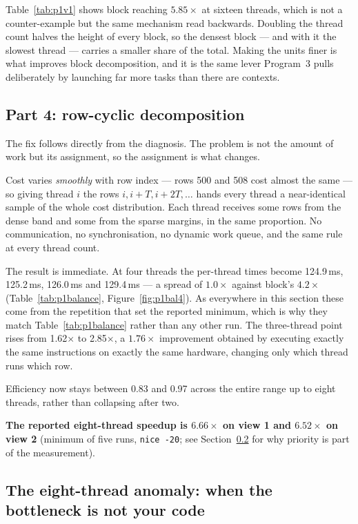 \documentclass[11pt,a4paper]{article}
\newcommand{\ms}[1]{#1\,ms}
\begin{document}
Table~\ref{tab:p1v1} shows block reaching $5.85\times$ at sixteen threads,
which is not a counter-example but the same mechanism read backwards. Doubling
the thread count halves the height of every block, so the densest block --- and
with it the slowest thread --- carries a smaller share of the total. Making the
units finer is what improves block decomposition, and it is the same lever
Program~3 pulls deliberately by launching far more tasks than there are
contexts.

\subsection{Part 4: row-cyclic decomposition}

The fix follows directly from the diagnosis. The problem is not the amount of
work but its assignment, so the assignment is what changes.

Cost varies \emph{smoothly} with row index --- rows 500 and 508 cost almost
the same --- so giving thread $i$ the rows $i, i+T, i+2T, \dots$ hands every
thread a near-identical sample of the whole cost distribution. Each thread
receives some rows from the dense band and some from the sparse margins, in
the same proportion. No communication, no synchronisation, no dynamic work
queue, and the same rule at every thread count.

The result is immediate. At four threads the per-thread times become
\ms{124.9}, \ms{125.2}, \ms{126.0} and \ms{129.4} --- a spread of
$1.0\times$ against block's $4.2\times$ (Table~\ref{tab:p1balance},
Figure~\ref{fig:p1bal4}). As everywhere in this section these come from the
repetition that set the reported minimum, which is why they match
Table~\ref{tab:p1balance} rather than any other run. The
three-thread point rises from 1.62$\times$ to 2.85$\times$, a $1.76\times$
improvement obtained by executing exactly the same instructions on exactly the
same hardware, changing only which thread runs which row.

Efficiency now stays between 0.83 and 0.97 across the entire range up to eight
threads, rather than collapsing after two.

\textbf{The reported eight-thread speedup is $6.66\times$ on view 1 and
$6.52\times$ on view 2} (minimum of five runs, \texttt{nice -20}; see
Section~\ref{sec:p1sched} for why priority is part of the measurement).

\subsection{The eight-thread anomaly: when the bottleneck is not your code}
\label{sec:p1sched}
\end{document}
